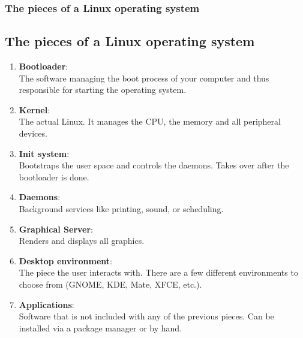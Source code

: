 \begin{frame}
	\frametitle{The pieces of a Linux operating system}
	\subsection{The pieces of a Linux operating system}
	
	\begin{enumerate}
		\item \textbf{Bootloader}:\\ The software managing the boot process of your computer and thus responsible for starting the operating system.
		\item \textbf{Kernel}:\\ The actual Linux. It manages the CPU, the memory and all peripheral devices.
		\item \textbf{Init system}:\\ Bootstraps the user space and controls the daemons. Takes over after the bootloader is done.
		\item \textbf{Daemons}:\\ Background services like printing, sound, or scheduling.
		\item \textbf{Graphical Server}:\\ Renders and displays all graphics.
		\item \textbf{Desktop environment}:\\ The piece the user interacts with. There are a few different environments to choose from (GNOME, KDE, Mate, XFCE, etc.).
		\item \textbf{Applications}:\\ Software that is not included with any of the previous pieces. Can be installed via a package manager or by hand.
	\end{enumerate}
\end{frame}
